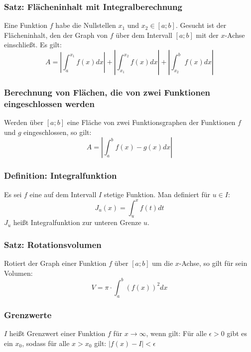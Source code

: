 \documentclass{article}
\begin{document}
  \subsubsection{Satz: Flächeninhalt mit Integralberechnung}
  Eine Funktion $f$ habe die Nullstellen $x_1$ und $x_2 \in [a;b]$. Gesucht ist der Flächeninhalt, den der Graph von $f$ über dem Intervall $[a;b]$ mit der $x$-Achse einschließt. Es gilt:
  \begin{equation*}
  	A = |\int^{x_1}_a f(x) dx| + |\int^{x_2}_{x_1} f(x) dx| + |\int^b_{x_2} f(x) dx|
  \end{equation*}
  
  \subsubsection{Berechnung von Flächen, die von zwei Funktionen eingeschlossen werden}
  Werden über $[a;b]$ eine Fläche von zwei Funktionsgraphen der Funktionen $f$ und $g$ eingeschlossen, so gilt: 
  \begin{equation*}
  	A = |\int^b_a f(x) - g(x) dx|
  \end{equation*}
  
  \subsubsection{Definition: Integralfunktion}
  Es sei $f$ eine auf dem Intervall $I$ stetige Funktion. Man definiert für $u \in I$: 
  \begin{equation*}
  	J_u(x) = \int^x_u f(t) dt
  \end{equation*}
  $J_u$ heißt Integralfunktion zur unteren Grenze $u$.
  
  \subsubsection{Satz: Rotationsvolumen}
  Rotiert der Graph einer Funktion $f$ über $[a;b]$ um die $x$-Achse, so gilt für sein Volumen: 
  \begin{equation*}
  	V = \pi \cdot \int^b_a (f(x))^2 dx
  \end{equation*}
  
  \subsubsection{Grenzwerte}
  $I$ heißt Grenzwert einer Funktion $f$ für $x \rightarrow \infty$, wenn gilt: Für alle $\epsilon > 0$ gibt es ein $x_0$, sodass für alle $x > x_0$ gilt: $ |f(x) - I| < \epsilon$
  
\end{document}
